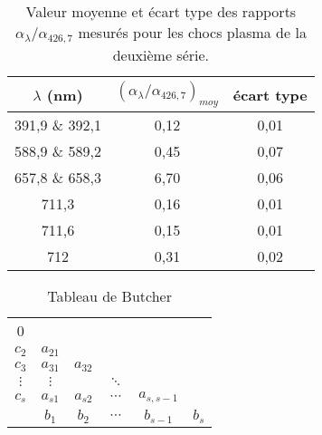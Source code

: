 \lipsum[2]
\begin{table}[h!tbp]
\begin{center}
\begin{tabular}{|c | c | c |}
\hline
$\lambda$ (nm) & $(\alpha_{\lambda}/\alpha_{426,7})_{moy}$ & écart type \\
\hline
391,9 \& 392,1 & 0,12 & 0,01 \\
588,9 \& 589,2 & 0,45 & 0,07 \\
657,8 \& 658,3 & 6,70 & 0,06 \\
711,3 & 0,16 & 0,01 \\
711,6 & 0,15 & 0,01 \\
712 & 0,31 & 0,02 \\
\hline
\end{tabular}
\end{center}
\caption[Valeur moyenne et écart type des rapports $\alpha_{\lambda}/\alpha_{426,7}$]{Valeur moyenne et écart type des rapports $\alpha_{\lambda}/\alpha_{426,7}$ mesurés pour les chocs plasma de la deuxième série.}
\label{table:alpha}
\end{table}
\lipsum[3]
\begin{table}[h!tbp]
\begin{center}
\begin{tabular}{c|*{5}{c}}
0\\
$c_2$    & $a_{21}$\\
$c_3$    & $a_{31}$ & $a_{32}$\\
$\vdots$ & $\vdots$ &           & $\ddots$\\
$c_s$    & $a_{s1}$ & $a_{s2}$  & $\cdots$ & $a_{s,s - 1}$\\
\hline
         & $b_1$    & $b_2$     & $\cdots$ & $b_{s-1}$     & $b_s$\\
\end{tabular}
\end{center}
\caption{Tableau de Butcher}
\label{table:butcher}
\end{table}

